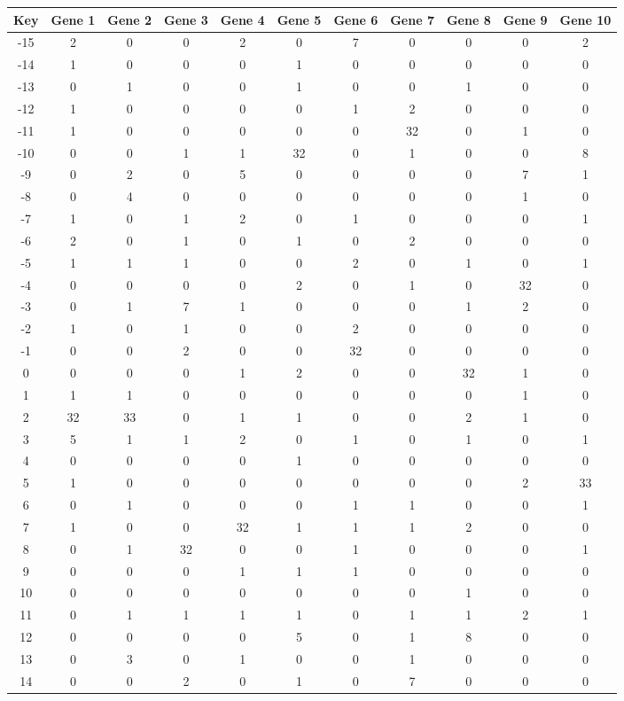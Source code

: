 \begin{tabular}{|c|c|c|c|c|c|c|c|c|c|c|}
\hline
Key & Gene 1 & Gene 2 & Gene 3 & Gene 4 & Gene 5 & Gene 6 & Gene 7 & Gene 8 & Gene 9 & Gene 10 \\
\hline
-15 & 2 & 0 & 0 & 2 & 0 & 7 & 0 & 0 & 0 & 2 \\
-14 & 1 & 0 & 0 & 0 & 1 & 0 & 0 & 0 & 0 & 0 \\
-13 & 0 & 1 & 0 & 0 & 1 & 0 & 0 & 1 & 0 & 0 \\
-12 & 1 & 0 & 0 & 0 & 0 & 1 & 2 & 0 & 0 & 0 \\
-11 & 1 & 0 & 0 & 0 & 0 & 0 & 32 & 0 & 1 & 0 \\
-10 & 0 & 0 & 1 & 1 & 32 & 0 & 1 & 0 & 0 & 8 \\
-9 & 0 & 2 & 0 & 5 & 0 & 0 & 0 & 0 & 7 & 1 \\
-8 & 0 & 4 & 0 & 0 & 0 & 0 & 0 & 0 & 1 & 0 \\
-7 & 1 & 0 & 1 & 2 & 0 & 1 & 0 & 0 & 0 & 1 \\
-6 & 2 & 0 & 1 & 0 & 1 & 0 & 2 & 0 & 0 & 0 \\
-5 & 1 & 1 & 1 & 0 & 0 & 2 & 0 & 1 & 0 & 1 \\
-4 & 0 & 0 & 0 & 0 & 2 & 0 & 1 & 0 & 32 & 0 \\
-3 & 0 & 1 & 7 & 1 & 0 & 0 & 0 & 1 & 2 & 0 \\
-2 & 1 & 0 & 1 & 0 & 0 & 2 & 0 & 0 & 0 & 0 \\
-1 & 0 & 0 & 2 & 0 & 0 & 32 & 0 & 0 & 0 & 0 \\
0 & 0 & 0 & 0 & 1 & 2 & 0 & 0 & 32 & 1 & 0 \\
1 & 1 & 1 & 0 & 0 & 0 & 0 & 0 & 0 & 1 & 0 \\
2 & 32 & 33 & 0 & 1 & 1 & 0 & 0 & 2 & 1 & 0 \\
3 & 5 & 1 & 1 & 2 & 0 & 1 & 0 & 1 & 0 & 1 \\
4 & 0 & 0 & 0 & 0 & 1 & 0 & 0 & 0 & 0 & 0 \\
5 & 1 & 0 & 0 & 0 & 0 & 0 & 0 & 0 & 2 & 33 \\
6 & 0 & 1 & 0 & 0 & 0 & 1 & 1 & 0 & 0 & 1 \\
7 & 1 & 0 & 0 & 32 & 1 & 1 & 1 & 2 & 0 & 0 \\
8 & 0 & 1 & 32 & 0 & 0 & 1 & 0 & 0 & 0 & 1 \\
9 & 0 & 0 & 0 & 1 & 1 & 1 & 0 & 0 & 0 & 0 \\
10 & 0 & 0 & 0 & 0 & 0 & 0 & 0 & 1 & 0 & 0 \\
11 & 0 & 1 & 1 & 1 & 1 & 0 & 1 & 1 & 2 & 1 \\
12 & 0 & 0 & 0 & 0 & 5 & 0 & 1 & 8 & 0 & 0 \\
13 & 0 & 3 & 0 & 1 & 0 & 0 & 1 & 0 & 0 & 0 \\
14 & 0 & 0 & 2 & 0 & 1 & 0 & 7 & 0 & 0 & 0 \\
\hline
\end{tabular}